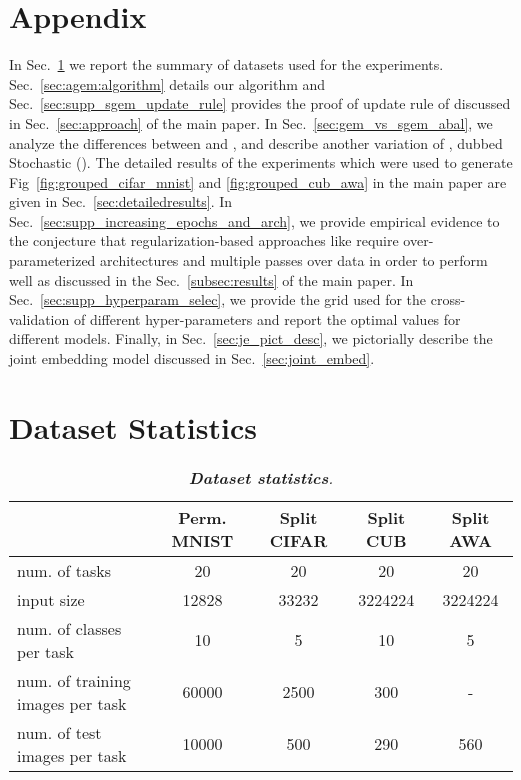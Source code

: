 \clearpage

\section*{Appendix}
In Sec.~\ref{sec:dataset_stats} we report the summary of datasets used for the experiments. Sec.~\ref{sec:agem:algorithm} details our \sgem algorithm and Sec.~\ref{sec:supp_sgem_update_rule} provides the proof of update rule of \sgem discussed in Sec.~\ref{sec:approach} of the main paper. In Sec.~\ref{sec:gem_vs_sgem_abal}, we analyze the differences between \sgem and \gem, and describe another variation of \gem, dubbed Stochastic \gem (\mgem). The detailed results of the experiments which were used to generate Fig~\ref{fig:grouped_cifar_mnist} and \ref{fig:grouped_cub_awa} in the main paper are given in Sec.~\ref{sec:detailedresults}. In Sec.~\ref{sec:supp_increasing_epochs_and_arch}, we provide empirical evidence to the conjecture that regularization-based approaches like \ewc require over-parameterized architectures and multiple passes over data in order to perform well as discussed in the Sec.~\ref{subsec:results} of the main paper. In Sec.~\ref{sec:supp_hyperparam_selec}, we provide the grid used for the cross-validation of different hyper-parameters and report the optimal values for different models. Finally, in Sec.~\ref{sec:je_pict_desc}, we pictorially describe the joint embedding model discussed in Sec.~\ref{sec:joint_embed}. 

\appendix

\section{Dataset Statistics}
\label{sec:dataset_stats}
\begin{table}[bh]
\small
\centering
\caption{\em \textbf{Dataset statistics}.}
\label{tab:datasets}
\begin{tabular}{l|cccc}
\toprule
  & \textbf{Perm. MNIST} &\textbf{Split CIFAR} & \textbf{Split CUB} & \textbf{Split AWA} \\
\hline
num. of tasks & 20 & 20 & 20 & 20 \\
input size & 12828 & 33232 & 3224224 & 3224224 \\ 
num. of classes per task & 10 & 5 & 10 & 5 \\
num. of training images per task & 60000 & 2500 & 300 & - \\ 
num. of test images per task & 10000 & 500 & 290 & 560 \\  
\bottomrule
\end{tabular}
\end{table}

